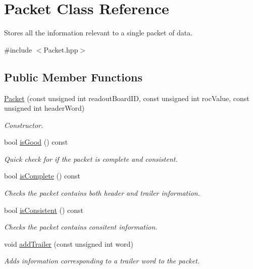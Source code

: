 \hypertarget{class_packet}{}\section{Packet Class Reference}
\label{class_packet}


Stores all the information relevant to a single packet of data.  




{\ttfamily \#include $<$Packet.\+hpp$>$}

\subsection*{Public Member Functions}
\begin{DoxyCompactItemize}
\item 
\hyperlink{class_packet_ac78ad72c2d0333e03dfdd5460fd6e816}{Packet} (const unsigned int readout\+Board\+ID, const unsigned int roc\+Value, const unsigned int header\+Word)
\begin{DoxyCompactList}\small\item\em Constructor. \end{DoxyCompactList}\item 
bool \hyperlink{class_packet_ae70511a50e1f186b8a3369ee6ab8589c}{is\+Good} () const
\begin{DoxyCompactList}\small\item\em Quick check for if the packet is complete and consistent. \end{DoxyCompactList}\item 
bool \hyperlink{class_packet_a6b5ce354c03663c98cccd31ad9a6f5ff}{is\+Complete} () const
\begin{DoxyCompactList}\small\item\em Checks the packet contains both header and trailer information. \end{DoxyCompactList}\item 
bool \hyperlink{class_packet_a8d9e544f6f56389fa13bb01b2d37ca58}{is\+Consistent} () const
\begin{DoxyCompactList}\small\item\em Checks the packet contains consitent information. \end{DoxyCompactList}\item 
void \hyperlink{class_packet_a13eccb2f6b6d527549839579920e5105}{add\+Trailer} (const unsigned int word)
\begin{DoxyCompactList}\small\item\em Adds information corresponding to a trailer word to the packet. \end{DoxyCompactList}\item 

\end{DoxyCompactItemize}
